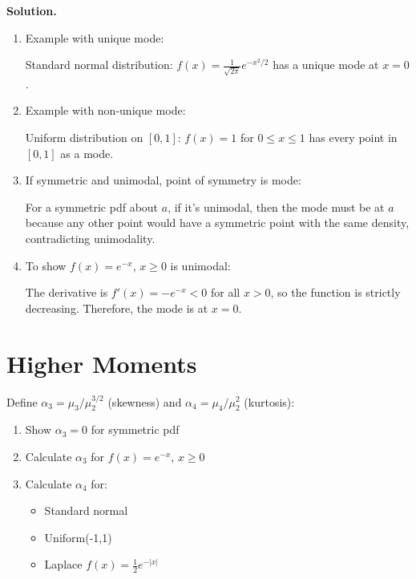 \noindent\textbf{Solution.}
\begin{enumerate}[label=(\alph*)]
    \item Example with unique mode:
    
    Standard normal distribution: $f(x) = \frac{1}{\sqrt{2\pi}}e^{-x^2/2}$ has a unique mode at $x = 0$.
    
    \item Example with non-unique mode:
    
    Uniform distribution on $[0,1]$: $f(x) = 1$ for $0 \leq x \leq 1$ has every point in $[0,1]$ as a mode.
    
    \item If symmetric and unimodal, point of symmetry is mode:
    
    For a symmetric pdf about $a$, if it's unimodal, then the mode must be at $a$ because any other point would have a symmetric point with the same density, contradicting unimodality.
    
    \item To show $f(x)=e^{-x}$, $x\geq0$ is unimodal:
    
    The derivative is $f'(x) = -e^{-x} < 0$ for all $x > 0$, so the function is strictly decreasing. Therefore, the mode is at $x = 0$.
\end{enumerate}

\section{Higher Moments}

\begin{problembox}
Define $\alpha_3=\mu_3/\mu_2^{3/2}$ (skewness) and $\alpha_4=\mu_4/\mu_2^2$ (kurtosis):
\begin{enumerate}[label=(\alph*)]
    \item Show $\alpha_3=0$ for symmetric pdf
    \item Calculate $\alpha_3$ for $f(x)=e^{-x}$, $x\geq0$
    \item Calculate $\alpha_4$ for:
    \begin{itemize}
        \item Standard normal
        \item Uniform(-1,1)
        \item Laplace $f(x)=\frac{1}{2}e^{-|x|}$
    \end{itemize}
\end{enumerate}
\end{problembox}

